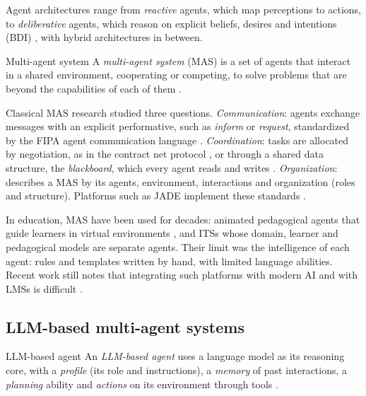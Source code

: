 Agent architectures range from \emph{reactive} agents, which map
perceptions to actions, to \emph{deliberative} agents, which reason on
explicit beliefs, desires and intentions (BDI) \cite{rao1995}, with hybrid
architectures in between.

\begin{definitionbox}{Multi-agent system}
A \emph{multi-agent system} (MAS) is a set of agents that interact in a
shared environment, cooperating or competing, to solve problems that are
beyond the capabilities of each of them \cite{ferber1999,wooldridge2009}.
\end{definitionbox}

Classical MAS research studied three questions. \emph{Communication}:
agents exchange messages with an explicit performative, such as
\emph{inform} or \emph{request}, standardized by the FIPA agent
communication language \cite{fipa2002}. \emph{Coordination}: tasks are
allocated by negotiation, as in the contract net protocol
\cite{smith1980}, or through a shared data structure, the
\emph{blackboard}, which every agent reads and writes \cite{nii1986}.
\emph{Organization}: \citet{demazeau1995} describes a MAS by its agents,
environment, interactions and organization (roles and structure).
Platforms such as JADE implement these standards \cite{bellifemine2007}.

In education, MAS have been used for decades: animated pedagogical agents
that guide learners in virtual environments \cite{johnson2000}, and ITSs
whose domain, learner and pedagogical models are separate agents. Their
limit was the intelligence of each agent: rules and templates written by
hand, with limited language abilities. Recent work still notes that
integrating such platforms with modern AI and with LMSs is difficult
\cite{lopezgoyez2026exploratory}.

\subsection{LLM-based multi-agent systems}
\label{subsec-llm-mas}

\begin{definitionbox}{LLM-based agent}
An \emph{LLM-based agent} uses a language model as its reasoning core,
with a \emph{profile} (its role and instructions), a \emph{memory} of past
interactions, a \emph{planning} ability and \emph{actions} on its
environment through tools \cite{wang2024agents}.
\end{definitionbox}


